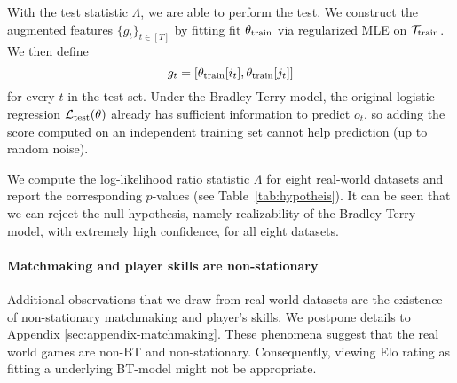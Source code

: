 With the test statistic $\Lambda$, we are able to perform the test. We construct the augmented features $\{g_t\}_{t\in [T]}$ by fitting fit $\theta_{\rm train}$ via regularized MLE on $\mathcal{T}_{\rm train}$. We then define 
\[
g_t = [\theta_{\rm train}[i_t], \theta_{\rm train}[j_t]]
\]
for every $t$ in the test set. Under the Bradley-Terry model, the original logistic regression $\mathcal{L}_{\rm test}(\theta)$ already has sufficient information to predict $o_t$, so adding the score computed on an independent training set cannot help prediction (up to random noise).

We compute the log-likelihood ratio statistic $\Lambda$ for eight real-world datasets and report the corresponding $p$-values (see Table~\ref{tab:hypotheis}).
It can be seen that we can reject the null hypothesis, namely realizability of the Bradley-Terry model, with extremely high confidence, for all eight datasets.




\paragraph{Matchmaking and player skills are non-stationary}
Additional observations that we draw from real-world datasets are the existence of non-stationary matchmaking and player's skills. We postpone details to Appendix \ref{sec:appendix-matchmaking}. These phenomena suggest that the real world games are non-BT and non-stationary. Consequently, viewing Elo rating as fitting a underlying BT-model might not be appropriate. 




